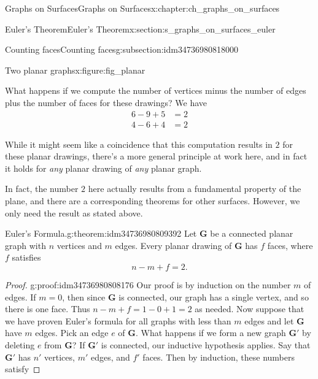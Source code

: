\documentclass[oneside,10pt,]{book}
\numberwithin{equation}{section}
\newcommand{\bfG}{\mathbf{G}}
\newcommand{\amp}{&}
\begin{document}
\begin{chapterptx}{Graphs on Surfaces}{}{Graphs on Surfaces}{}{}{x:chapter:ch_graphs_on_surfaces}
\begin{sectionptx}{Euler's Theorem}{}{Euler's Theorem}{}{}{x:section:s_graphs_on_surfaces_euler}
\begin{subsectionptx}{Counting faces}{}{Counting faces}{}{}{g:subsection:idm34736980818000}
\begin{figureptx}{Two planar graphs}{x:figure:fig_planar}{}
%
\tcblower
\end{figureptx}%
What happens if we compute the number of vertices minus the number of edges plus the number of faces for these drawings? We have%
\begin{align*}
6-9+5 \amp = 2\\
4-6+4 \amp =2
\end{align*}
%
\par
While it might seem like a coincidence that this computation results in \(2\) for these planar drawings, there's a more general principle at work here, and in fact it holds for \emph{any} planar drawing of \emph{any} planar graph.%
\par
In fact, the number \(2\) here actually results from a fundamental property of the plane, and there are a corresponding theorems for other surfaces. However, we only need the result as stated above.%
\begin{theorem}{Euler's Formula.}{}{g:theorem:idm34736980809392}%
%
Let \(\bfG\) be a connected planar graph with \(n\) vertices and \(m\) edges. Every planar drawing of \(\bfG\) has \(f\) faces, where \(f\) satisfies%
\begin{equation*}
n-m+f=2.
\end{equation*}
%
\end{theorem}
\begin{proof}{}{g:proof:idm34736980808176}
Our proof is by induction on the number \(m\) of edges. If \(m=0\), then since \(\bfG\) is connected, our graph has a single vertex, and so there is one face. Thus \(n-m+f = 1-0+1=2\) as needed. Now suppose that we have proven Euler's formula for all graphs with less than \(m\) edges and let \(\bfG\) have \(m\) edges. Pick an edge \(e\) of \(\bfG\). What happens if we form a new graph \(\bfG'\) by deleting \(e\) from \(\bfG\)? If \(\bfG'\) is connected, our inductive hypothesis applies. Say that \(\bfG'\) has \(n'\) vertices, \(m'\) edges, and \(f'\) faces. Then by induction, these numbers satisfy%

\end{proof}
\end{subsectionptx}
\end{sectionptx}
\end{chapterptx}
\end{document}
